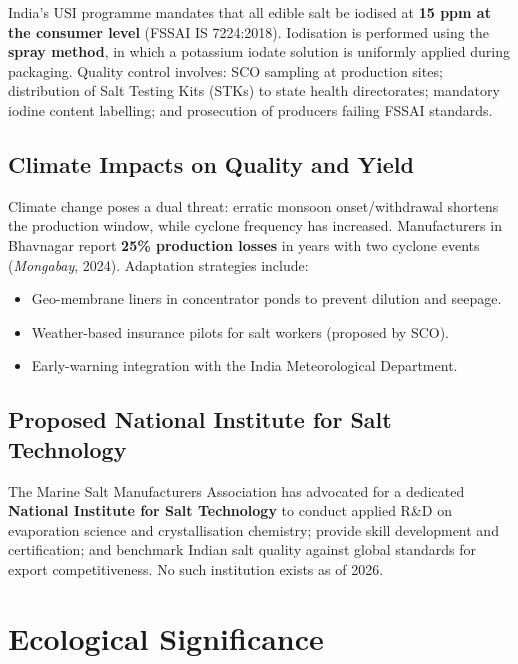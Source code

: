 \documentclass[12pt,a4paper]{article}
\begin{document}
India's USI programme mandates that all edible salt be iodised at \textbf{15 ppm at
the consumer level} (FSSAI IS 7224:2018). Iodisation is performed using the
\textbf{spray method}, in which a potassium iodate solution is uniformly applied
during packaging. Quality control involves: SCO sampling at production sites;
distribution of Salt Testing Kits (STKs) to state health directorates; mandatory
iodine content labelling; and prosecution of producers failing FSSAI standards.

\subsection{Climate Impacts on Quality and Yield}

Climate change poses a dual threat: erratic monsoon onset/withdrawal shortens the
production window, while cyclone frequency has increased. Manufacturers in Bhavnagar
report \textbf{25\% production losses} in years with two cyclone events
(\textit{Mongabay}, 2024). Adaptation strategies include:
\begin{itemize}[leftmargin=*]
  \item Geo-membrane liners in concentrator ponds to prevent dilution and seepage.
  \item Weather-based insurance pilots for salt workers (proposed by SCO).
  \item Early-warning integration with the India Meteorological Department.
\end{itemize}

\subsection{Proposed National Institute for Salt Technology}

The Marine Salt Manufacturers Association has advocated for a dedicated
\textbf{National Institute for Salt Technology} to conduct applied R\&D on evaporation
science and crystallisation chemistry; provide skill development and certification;
and benchmark Indian salt quality against global standards for export competitiveness.
No such institution exists as of 2026.

\section{Ecological Significance}
\end{document}

